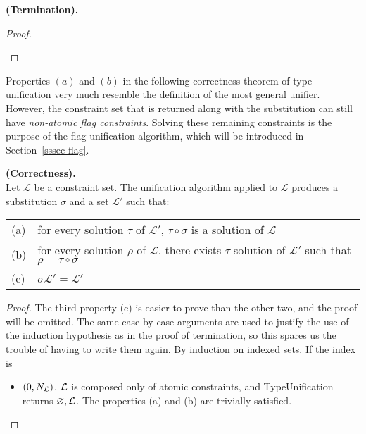\begin{thm}{\bf (Termination).}
\begin{proof}
\begin{itemize}
		\end{itemize}
	\end{proof}
\end{thm}

\begin{remark} Properties $(a)$ and $(b)$ in the following correctness
  theorem of type unification very much resemble the definition of the
  most general unifier.  However, the constraint set that is returned
  along with the substitution can still have {\em non-atomic flag
    constraints}.  Solving these remaining constraints is the purpose
  of the flag unification algorithm, which will be introduced in
  Section~\ref{sssec-flag}.
\end{remark}


\begin{thm}{\bf (Correctness).} \\
	Let $\mathcal{L}$ be a constraint set. The unification algorithm applied to $\mathcal{L}$ produces
	a substitution $\sigma$ and a set $\mathcal{L'}$ such that:
		\begin{center}
		\begin{tabular}{ll}
			(a) & for every solution $\tau$ of $\mathcal{L'}$, $\tau \circ \sigma$ is a solution of $\mathcal{L}$ \\
			(b) & for every solution $\rho$ of $\mathcal{L}$, there exists $\tau$ solution of $\mathcal{L'}$ such that $\rho = \tau \circ \sigma$ \\
			(c) & $\sigma \mathcal{L'} = \mathcal{L'}$
		\end{tabular}
		\end{center}

	\begin{proof}
		The third property (c) is easier to prove than the other two, and the proof will be omitted. The same case by case arguments are
		used to justify the use of the induction hypothesis as in the proof of termination, so this spares us the trouble of having to write
		them again. By induction on indexed sets. If the index is
		\begin{itemize}
			\item $(0, N_{\mathcal{L}})$. $\mathcal{L}$ is composed only of atomic constraints, and TypeUnification returns $\varnothing, \mathcal{L}$.
				The properties (a) and (b) are trivially satisfied.
				

\end{itemize}
\end{proof}
\end{thm}
